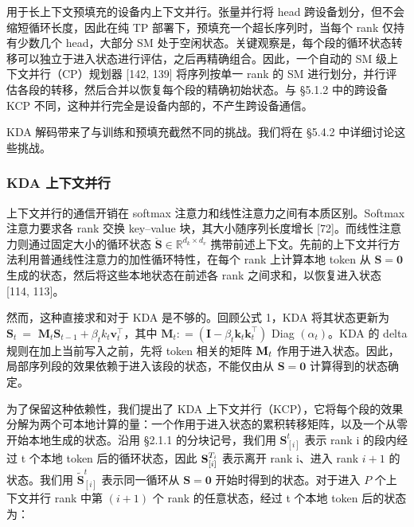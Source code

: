 \documentclass[
  10
]{article}
\begin{document}
用于长上下文预填充的设备内上下文并行。张量并行将 head 跨设备划分，但不会缩短循环长度，因此在纯 TP 部署下，预填充一个超长序列时，当每个 rank 仅持有少数几个 head，大部分 SM 处于空闲状态。关键观察是，每个段的循环状态转移可以独立于进入状态进行评估，之后再精确组合。因此，一个自动的 SM 级上下文并行（CP）规划器 {[}142, 139{]} 将序列按单一 rank 的 SM 进行划分，并行评估各段的转移，然后合并以恢复每个段的精确初始状态。与 §5.1.2 中的跨设备 KCP 不同，这种并行完全是设备内部的，不产生跨设备通信。

KDA 解码带来了与训练和预填充截然不同的挑战。我们将在 §5.4.2 中详细讨论这些挑战。

\subsubsection{KDA 上下文并行}\label{kda-context-parallelism}

上下文并行的通信开销在 softmax 注意力和线性注意力之间有本质区别。Softmax 注意力要求各 rank 交换 key--value 块，其大小随序列长度增长 {[}72{]}。而线性注意力则通过固定大小的循环状态 \(\breve { \mathbf { S } } \in \mathbb { R } ^ { d _ { k } \times d _ { v } }\) 携带前述上下文。先前的上下文并行方法利用普通线性注意力的加性循环特性，在每个 rank 上计算本地 token 从 \(\mathbf { S } = \mathbf { 0 }\) 生成的状态，然后将这些本地状态在前述各 rank 之间求和，以恢复进入状态 {[}114, 113{]}。

然而，这种直接求和对于 KDA 是不够的。回顾公式 1，KDA 将其状态更新为 \(\mathbf { S } _ { t } ~ =\) \(\mathbf { M } _ { t } \mathbf { S } _ { t - 1 } + \beta _ { t } k _ { t } \pmb { v } _ { t } ^ { \top }\)，其中 \(\mathbf { M } _ { t } : = \left( \mathbf { I } - \beta _ { t } \pmb { k } _ { t } \pmb { k } _ { t } ^ { \top } \right)\) Diag \(\left( \alpha _ { t } \right)\)。KDA 的 delta 规则在加上当前写入之前，先将 token 相关的矩阵 \({ { \bf { M } } _ { t } }\) 作用于进入状态。因此，局部序列段的效果依赖于进入该段的状态，不能仅由从 \(\mathbf { S } = \mathbf { 0 }\) 计算得到的状态确定。

为了保留这种依赖性，我们提出了 KDA 上下文并行（KCP），它将每个段的效果分解为两个可本地计算的量：一个作用于进入状态的累积转移矩阵，以及一个从零开始本地生成的状态。沿用 §2.1.1 的分块记号，我们用 \(\mathbf { S } _ { [ i ] } ^ { t }\) 表示 rank i 的段内经过 t 个本地 token 后的循环状态，因此 \({ \bf S } _ { [ i ] } ^ { T _ { i } }\) 表示离开 rank i、进入 rank \(i + 1\) 的状态。我们用 \(\widetilde { \mathbf { S } } _ { [ i ] } ^ { t }\) 表示同一循环从 \(\mathbf { S } = \mathbf { 0 }\) 开始时得到的状态。对于进入 \(P\) 个上下文并行 rank 中第 \(( i + 1 )\) 个 rank 的任意状态，经过 t 个本地 token 后的状态为：
\end{document}
